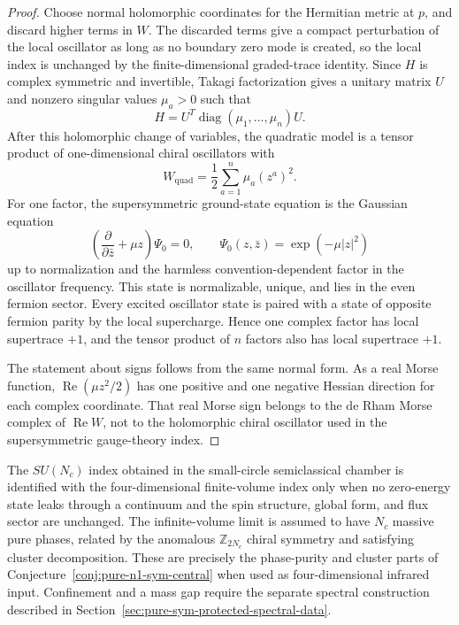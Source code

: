 \begin{proof}
Choose normal holomorphic coordinates for the Hermitian metric at \(p\), and
discard higher terms in \(W\).  The discarded terms give a compact
perturbation of the local oscillator as long as no boundary zero mode is
created, so the local index is unchanged by the finite-dimensional
graded-trace identity.  Since \(H\) is complex symmetric and invertible,
Takagi factorization gives a unitary matrix \(U\) and nonzero singular values
\(\mu_a>0\) such that
\[
  H=U^T\operatorname{diag}(\mu_1,\ldots,\mu_n)U .
\]
After this holomorphic change of variables, the quadratic model is a tensor
product of one-dimensional chiral oscillators with
\[
  W_{\mathrm{quad}}
  =
  \frac12\sum_{a=1}^n \mu_a (z^a)^2 .
\]
For one factor, the supersymmetric ground-state equation is the Gaussian
equation
\[
  \left(\frac{\partial}{\partial \bar z}
        +\mu z\right)\Psi_0=0,
  \qquad
  \Psi_0(z,\bar z)=\exp(-\mu |z|^2)
\]
up to normalization and the harmless convention-dependent factor in the
oscillator frequency.  This state is normalizable, unique, and lies in the
even fermion sector.  Every excited oscillator state is paired with a state
of opposite fermion parity by the local supercharge.  Hence one complex
factor has local supertrace \(+1\), and the tensor product of \(n\) factors
also has local supertrace \(+1\).

The statement about signs follows from the same normal form.  As a real
Morse function, \(\operatorname{Re}(\mu z^2/2)\) has one positive and one
negative Hessian direction for each complex coordinate.  That real Morse
sign belongs to the de Rham Morse complex of \(\operatorname{Re}W\), not to
the holomorphic chiral oscillator used in the supersymmetric gauge-theory
index.
\end{proof}

\begin{hypothesis}
\label{hyp:pure-sym-index-continuation-massive-branch}
The \(SU(N_c)\) index obtained in the small-circle semiclassical chamber is
identified with the four-dimensional finite-volume index only when no
zero-energy state leaks through a continuum and the spin structure, global
form, and flux sector are unchanged.  The infinite-volume limit is assumed
to have \(N_c\) massive pure phases, related by the anomalous
\(\mathbb Z_{2N_c}\) chiral symmetry and satisfying cluster decomposition.
These are precisely the phase-purity and cluster parts of
Conjecture~\ref{conj:pure-n1-sym-central} when used as four-dimensional
infrared input.  Confinement and a mass gap require the separate spectral
construction described in Section~\ref{sec:pure-sym-protected-spectral-data}.
\end{hypothesis}

